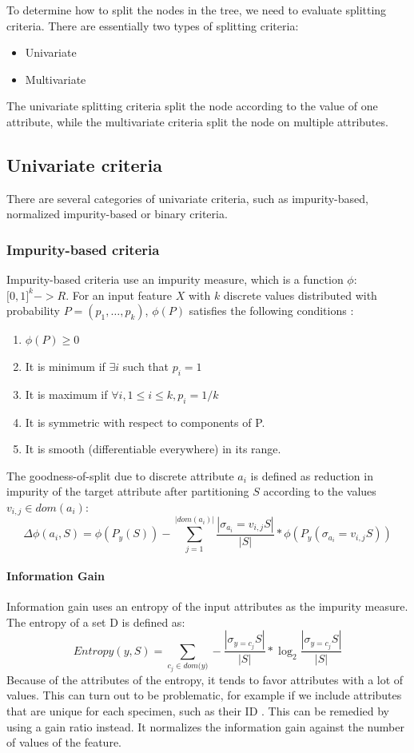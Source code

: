 \documentclass[thesis=B,english]{FITthesis}[2012/10/20]
\begin{document}
			To determine how to split the nodes in the tree, we need to evaluate splitting criteria. There are essentially two types of splitting criteria:
			\begin{itemize}
			\item Univariate
			\item Multivariate
			\end{itemize}
			The univariate splitting criteria split the node according to the value of one attribute, while the multivariate criteria split the node on multiple attributes.

			\subsection{Univariate criteria}
				There are several categories of univariate criteria, such as impurity-based, normalized impurity-based or binary criteria. \cite{DMWithDecisionTrees}
				\subsubsection*{Impurity-based criteria}
				Impurity-based criteria use an impurity measure, which is a function \(\phi\):\(\lbrack0,1\rbrack^k->R\). For an input feature \(X\) with \(k\) discrete values distributed with probability \(P=(p_1,\dots,p_k)\), \(\phi(P)\) satisfies the following conditions \cite{DMWithDecisionTrees}:
				\begin{enumerate}
				\item \(\phi(P) \geq 0\)
				\item It is minimum if \(\exists i\) such that \(p_i = 1\)
				\item It is maximum if \(\forall i, 1 \leq i \leq k, p_i = 1/k\)
				\item It is symmetric with respect to components of P.
				\item It is smooth (differentiable everywhere) in its range.	
				\end{enumerate}
				The goodness-of-split due to discrete attribute \(a_i\) is defined as reduction in impurity of the target attribute after partitioning \(S\) according to the values \(v_{i,j} \in \textit{dom}(a_i)\):
				\[
					\Delta\phi(a_i,S)=\phi(P_y(S))-\sum\limits_{j=1}^{|\textit{dom}(a_i)|}{\frac{|\sigma_{a_i}=v_{i,j}S|}{|S|}*\phi\left(P_y\left(\sigma_{a_i}=v_{i,j}S\right)\right)}
				\]

				\paragraph*{Information Gain}
				Information gain uses an entropy of the input attributes as the impurity measure. The entropy of a set D is defined as:
				\[
				\textit{Entropy}\left(y, S\right) = \sum _{c_j \in \textit{dom(y)}}-\frac{|\sigma_{y=c_j}S|}{|S|}*\log_2\frac{|\sigma_{y=c_j}S|}{|S|}
				\] 
				Because of the attributes of the entropy, it tends to favor attributes with a lot of values. This can turn out to be problematic, for example if we include attributes that are unique for each specimen, such as their ID \cite{ENSEMBLE}. This can be remedied by using a gain ratio instead. It normalizes the information gain against the number of values of the feature.
\end{document}
